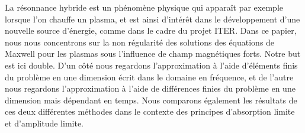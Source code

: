 La r\'esonnance hybride est un ph\'enom\`ene physique qui appara\^it par exemple lorsque l'on chauffe un plasma, et est ainsi d'int\'er\^et dans le d\'eveloppement d'une nouvelle source d'\'energie, comme dans le cadre du projet ITER. Dans ce papier, nous nous concentrons sur la non r\'egularit\'e des solutions des \'equations de Maxwell pour les plasmas sous l'influence de champ magn\'etiques forts. Notre but est ici double. D'un c\^ot\'e nous regardons l'approximation \`a l'aide d'\'el\'ements finis du probl\`eme en une dimension \'ecrit dans le domaine en fr\'equence, et de l'autre nous regardons l'approximation \`a l'aide de diff\'erences finies du probl\`eme en une dimension mais d\'ependant en temps. Nous comparons \'egalement les r\'esultats de ces deux diff\'erentes m\'ethodes dans le contexte des principes d'absorption limite et d'amplitude limite.